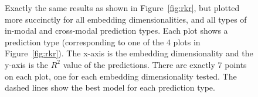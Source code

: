 \begin{figure}[t]
    \centering
    \caption{Exactly the same results as shown in Figure~\eqref{fig:rkr}, but plotted more succinctly for all embedding
    dimensionalities, and all types of in-modal and cross-modal prediction types.
    Each plot shows a prediction type (corresponding to one of the 4 plots in Figure~\eqref{fig:rkr}).
    The x-axis is the embedding dimensionality and the y-axis is the $R^{2}$ value of the predictions.
    There are exactly 7 points on each plot, one for each embedding dimensionality tested.
    The dashed lines show the best model for each prediction type.}
    \label{fig:r2_vs_embedding_dim}
\end{figure}


